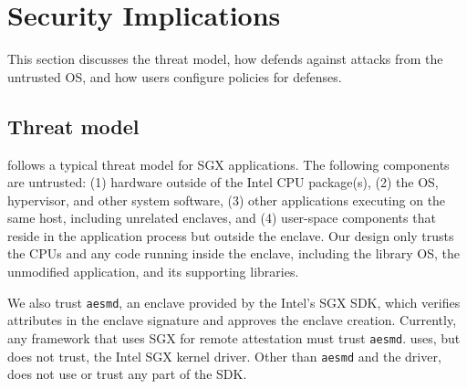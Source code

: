 \section{Security Implications}
\label{sec:sgx:security}

This section discusses the threat model,
how \graphenesgx{} defends against attacks from the untrusted OS,
and how users configure policies for defenses.


\subsection{Threat model}
\label{sec:sgx:overview:threat}

\graphenesgx{} follows a typical threat model for SGX applications.
The following components are untrusted:
(1) hardware outside of the Intel CPU package(s),
(2) the OS, hypervisor, and other system software,
(3) other applications executing on the same host, including unrelated enclaves,
and (4) user-space components that
reside in the application process but outside the enclave.
Our design only trusts the CPUs and any code running inside the enclave, including the library OS, the unmodified application, and its supporting libraries. 

We also trust {\tt aesmd}, an enclave provided by the Intel's SGX SDK, which verifies
attributes in the enclave signature and approves the enclave creation.
Currently, any framework that uses SGX for remote attestation must trust {\tt aesmd}.
\graphenesgx{} uses, but does not trust, the Intel SGX kernel driver.
Other than {\tt aesmd} and the driver, \graphenesgx{} does not use or trust any part of the SDK.

